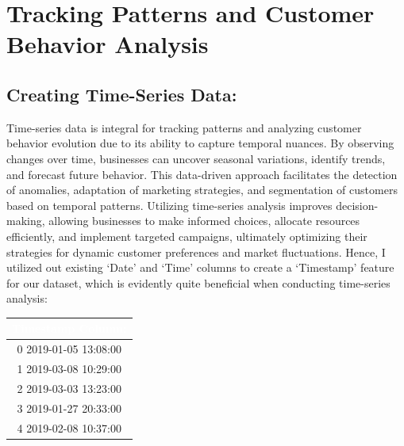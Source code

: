 
\chapter{Tracking Patterns and Customer Behavior Analysis} %

\label{Chapter1} %



\section{Creating Time-Series Data:}

 Time-series data is integral for tracking patterns and analyzing customer behavior evolution due to its ability to capture temporal nuances. By observing changes over time, businesses can uncover seasonal variations, identify trends, and forecast future behavior. This data-driven approach facilitates the detection of anomalies, adaptation of marketing strategies, and segmentation of customers based on temporal patterns. Utilizing time-series analysis improves decision-making, allowing businesses to make informed choices, allocate resources efficiently, and implement targeted campaigns, ultimately optimizing their strategies for dynamic customer preferences and market fluctuations.
\newline
 Hence, I utilized out existing ‘Date’ and ‘Time’ columns to create a ‘Timestamp’ feature for our dataset, which is evidently quite beneficial when conducting time-series analysis:


\begin{table}[htbp]
    \centering
    \begin{tabular}{|c|}
        \hline
        \rowcolor{blue!70}
        \textcolor{white}{\textbf{Timestamp Column:}} \\
        \hline
        \rowcolor{blue!50}
        0   2019-01-05 13:08:00\\
        1   2019-03-08 10:29:00 \\
        \rowcolor{blue!50}
        2   2019-03-03 13:23:00 \\
        3   2019-01-27 20:33:00 \\
        \rowcolor{blue!50}
        4   2019-02-08 10:37:00\\
        \hline
    \end{tabular}
    \label{tab:blue_table_with_header}
\end{table}

